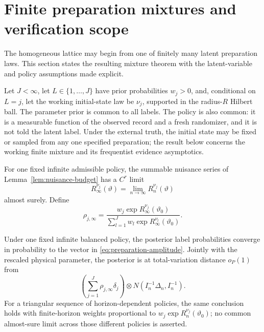 
\section{Finite preparation mixtures and verification scope}
\label{sec:preparations}

The homogeneous lattice may begin from one of finitely many latent
preparation laws.  This section states the resulting mixture theorem with the
latent-variable and policy assumptions made explicit.

Let \(J<\infty\), let \(L\in\{1,\ldots,J\}\) have prior probabilities
\(w_j>0\), and, conditional on \(L=j\), let the working initial-state law be
\(\nu_j\), supported in the radius-\(R\) Hilbert ball.  The parameter prior is
common to all labels.  The policy is also common: it is a measurable function
of the observed record and a fresh randomizer, and it is not told the latent
label.  Under the external truth, the initial state may be fixed or sampled
from any one specified preparation; the result below concerns the working
finite mixture and its frequentist evidence asymptotics.

For one fixed infinite admissible policy, the summable nuisance series of
Lemma~\ref{lem:nuisance-budget} has a \(C^r\) limit
\[
 R_\infty^{\nu_j}(\vartheta)
 =\lim_{n\to\infty}R_n^{\nu_j}(\vartheta)
\]
almost surely.  Define
\begin{equation}
 \rho_{j,\infty}
 =\frac{w_j\exp R_\infty^{\nu_j}(\vartheta_0)}
        {\sum_{l=1}^Jw_l\exp R_\infty^{\nu_l}(\vartheta_0)}.
 \label{eq:preparation-amplitude}
\end{equation}

\begin{theorem}
\label{thm:preparation-mixture}
Under one fixed infinite balanced policy, the posterior label probabilities
converge in probability to the vector in
\eqref{eq:preparation-amplitude}.  Jointly with the rescaled physical
parameter, the posterior is at total-variation distance \(o_P(1)\) from
\begin{equation}
 \left(\sum_{j=1}^J\rho_{j,\infty}\delta_j\right)
 \otimes N(I_n^{-1}\Delta_n,I_n^{-1}).
 \label{eq:preparation-product}
\end{equation}
For a triangular sequence of horizon-dependent policies, the same conclusion
holds with finite-horizon weights proportional to
\(w_j\exp R_n^{\nu_j}(\vartheta_0)\); no common almost-sure limit across those
different policies is asserted.
\end{theorem}

